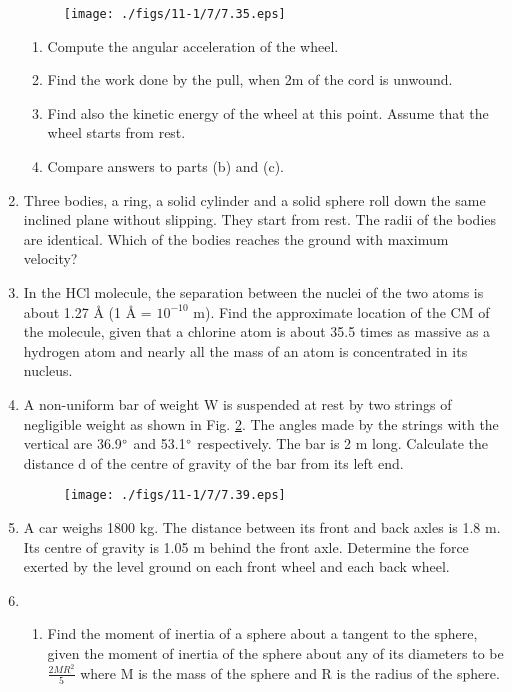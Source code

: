 \begin{enumerate}[label=\thesection.\arabic*.,ref=\thesection.\theenumi]
\begin{figure}[!ht]
\texttt{[image: ./figs/11-1/7/7.35.eps]}
\caption{}
\label{fig:7.35}
\end{figure}
\begin{enumerate}[label=(\alph*)]
\item  Compute the angular acceleration of the wheel.
\item  Find the work done by the pull, when 2m of the cord is unwound.
\item  Find also the kinetic energy of the wheel at this point. Assume that the wheel starts from rest.
\item  Compare answers to parts (b) and (c).
\end{enumerate}
\item Three bodies, a ring, a solid cylinder and a solid sphere roll down the same inclined plane without slipping. They start from rest. The radii of the bodies are identical. Which of the bodies reaches the ground with maximum velocity?
\item In the HCl molecule, the separation between the nuclei of the two atoms is about 
1.27 \si{\angstrom} (1 \si{\angstrom} = $10^{-10}$ m). 
Find the approximate location of the CM of the molecule, given that a chlorine atom is about 35.5 times as massive as a hydrogen atom and nearly all the mass of an atom is concentrated in its nucleus.
\item A non-uniform bar of weight W is suspended at rest by two strings of negligible weight as shown in Fig. \ref{fig:7.39}. The angles made by the strings with the vertical are 36.9$\degree$ and 53.1$\degree$ respectively. The bar is 2 m long. Calculate the distance d of the centre of gravity of the bar from its left end.
\begin{figure}[!ht]
\texttt{[image: ./figs/11-1/7/7.39.eps]}
\caption{}
\label{fig:7.39}
\end{figure}
\item A car weighs 1800 kg. The distance between its front and back axles is 1.8 m. Its centre of gravity is 1.05 m behind the front axle. Determine the force exerted by the level ground on each front wheel and each back wheel.
\item 
\begin{enumerate}[label=(\alph*)]
\item Find the moment of inertia of a sphere about a tangent to the sphere, given the moment of inertia of the sphere about any of its diameters to be $\frac{2MR^2}{5}$ where M is the mass of the sphere and R is the radius of the sphere.

\end{enumerate}
\end{enumerate}
